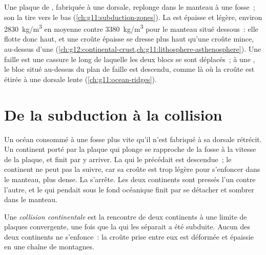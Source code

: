 \begin{recall}
Une plaque de , fabriquée à une dorsale, replonge dans
le manteau à une fosse~; son  la tire vers le bas
(\cref{ch:g11:subduction-zones}). La  est épaisse et
légère, environ \qty{2830}{kg/m^3} en moyenne contre \qty{3380}{kg/m^3}
pour le manteau situé dessous~: elle flotte donc haut, et une croûte
épaisse se dresse plus haut qu'une croûte mince, au-dessus d'une 
(\cref{ch:g12:continental-crust,ch:g11:lithosphere-asthenosphere}). Une
faille est une cassure le long de laquelle les deux blocs se sont
déplacés~; à une , le bloc situé au-dessus du plan de faille
est descendu, comme là où la croûte est étirée à une dorsale lente
(\cref{ch:g11:ocean-ridges}).
\end{recall}

\section{De la subduction à la collision}

Un océan consommé à une fosse plus vite qu'il n'est fabriqué à sa dorsale
rétrécit. Un continent porté par la plaque qui plonge se rapproche de la
fosse à la vitesse de la plaque, et finit par y arriver. La  qui le précédait est descendue~; le continent ne peut pas la
suivre, car sa croûte est trop légère pour s'enfoncer dans le manteau, plus
dense. La  s'arrête. Les deux continents sont pressés l'un contre
l'autre, et le  qui pendait sous le fond océanique finit
par se détacher et sombrer dans le manteau.

\begin{definition}\label{def:g12:mountain-building:collision}
Une \emph{collision continentale} est la
rencontre de deux continents à une limite de plaques convergente, une fois
que la  qui les séparait a été subduite. Aucun des
deux continents ne s'enfonce~: la croûte prise entre eux est déformée et
épaissie en une chaîne de montagnes.
\end{definition}

